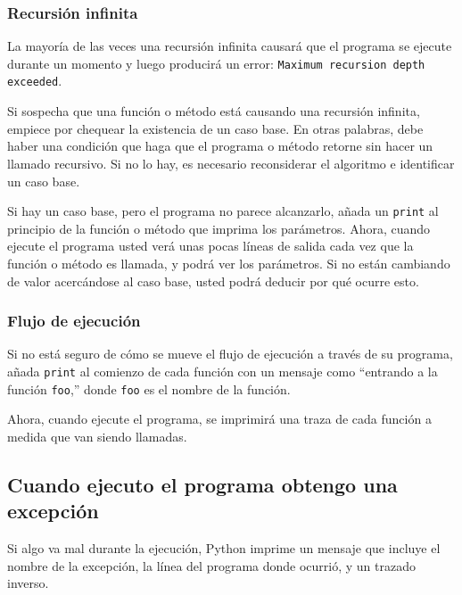 \subsubsection{Recursión infinita}

 

La mayoría de las veces una recursión infinita causará que el programa
se ejecute durante un momento y luego producirá un error: \texttt{Maximum
recursion depth exceeded}.

Si sospecha que una función o método está causando una recursión infinita,
empiece por chequear la existencia de un caso base. En otras palabras,
debe haber una condición que haga que el programa o método retorne
sin hacer un llamado recursivo. Si no lo hay, es necesario reconsiderar
el algoritmo e identificar un caso base.

Si hay un caso base, pero el programa no parece alcanzarlo, añada
un \texttt{print} al principio de la función o método que imprima
los parámetros. Ahora, cuando ejecute el programa usted verá unas
pocas líneas de salida cada vez que la función o método es llamada,
y podrá ver los parámetros. Si no están cambiando de valor acercándose
al caso base, usted podrá deducir por qué ocurre esto.

\subsubsection{Flujo de ejecución}

 

Si no está seguro de cómo se mueve el flujo de ejecución a través
de su programa, añada \texttt{print} al comienzo de cada función con
un mensaje como ``entrando a la función \texttt{foo},'' donde \texttt{foo}
es el nombre de la función.

Ahora, cuando ejecute el programa, se imprimirá una traza de cada
función a medida que van siendo llamadas.

\subsection{Cuando ejecuto el programa obtengo una excepción}

 

Si algo va mal durante la ejecución, Python imprime un mensaje que
incluye el nombre de la excepción, la línea del programa donde ocurrió,
y un trazado inverso.

